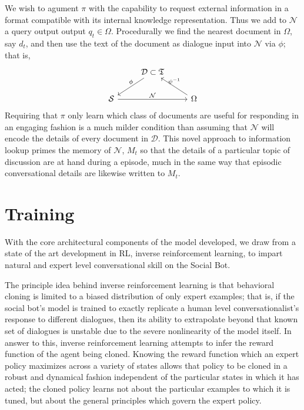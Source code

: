 \documentclass{article} %
\theoremstyle{named}
\def\scriptd{{\mathcal D}}
\def\scriptn{{\mathcal N}}
\def\scripts{{\mathcal S}}
\begin{document}
\begin{enumerate}
We wish to agument $\pi$ with the capability to request external information in a format compatible with its internal knowledge representation. Thus we add to $\scriptn$ a query output output $q_t \in \Omega.$ Procedurally we find the nearest document in $\Omega$, say $d_t$, and then use the text of the document as dialogue input into $\scriptn$ via $\phi$; that is,
\begin{equation*}
  \begin{tikzcd}
    & \scriptd \subset \mathfrak{T} \arrow{ld}[above]{\phi} & \\
    \scripts \arrow{rr}{\scriptn} & & \Omega \arrow{lu}[above]{\psi^{-1}}
  \end{tikzcd}
\end{equation*}
Requiring that $\pi$ only learn which class of documents are useful for responding in an engaging fashion is a much milder condition than assuming that $\scriptn$ will encode the details of every document in $\scriptd$. This novel approach to information lookup primes the memory of $\scriptn$, $M_t$ so that the details of a particular topic of discussion are at hand during a  episode, much in the same way that episodic conversational details are likewise written to $M_t$.
\end{enumerate}


\section{Training}
With the core architectural components of the model developed, we draw from a state of the art development in RL, inverse reinforcement learning\cite{ng2000algorithms}, to impart natural and expert level conversational skill on the Social Bot.

The principle idea behind inverse reinforcement learning is that behavioral cloning is limited to a biased distribution of only expert examples; that is, if the social bot’s model is trained to exactly replicate a human level conversationalist's response to different dialogues, then its ability to extrapolate beyond that known set of dialogues is unstable due to the severe nonlinearity of the model itself. In answer to this, inverse reinforcement learning attempts to infer the reward function of the agent being cloned. Knowing the reward function which an expert policy maximizes across a variety of states allows that policy to be cloned in a robust and dynamical fashion independent of the particular states in which it has acted; the cloned policy learns not about the particular examples to which it is tuned, but about the general principles which govern the expert policy.
\end{document}
